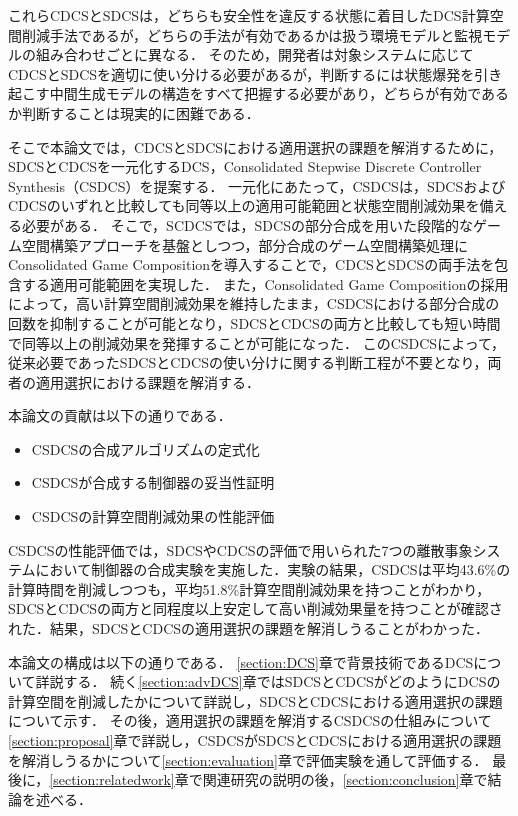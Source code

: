 これらCDCSとSDCSは，どちらも安全性を違反する状態に着目したDCS計算空間削減手法であるが，どちらの手法が有効であるかは扱う環境モデルと監視モデルの組み合わせごとに異なる．
そのため，開発者は対象システムに応じてCDCSとSDCSを適切に使い分ける必要があるが，判断するには状態爆発を引き起こす中間生成モデルの構造をすべて把握する必要があり，どちらが有効であるか判断することは現実的に困難である．

そこで本論文では，CDCSとSDCSにおける適用選択の課題を解消するために，SDCSとCDCSを一元化するDCS，Consolidated Stepwise Discrete Controller Synthesis（CSDCS）を提案する．
一元化にあたって，CSDCSは，SDCSおよびCDCSのいずれと比較しても同等以上の適用可能範囲と状態空間削減効果を備える必要がある．
そこで，SCDCSでは，SDCSの部分合成を用いた段階的なゲーム空間構築アプローチを基盤としつつ，部分合成のゲーム空間構築処理にConsolidated Game Compositionを導入することで，CDCSとSDCSの両手法を包含する適用可能範囲を実現した．
また，Consolidated Game Compositionの採用によって，高い計算空間削減効果を維持したまま，CSDCSにおける部分合成の回数を抑制することが可能となり，SDCSとCDCSの両方と比較しても短い時間で同等以上の削減効果を発揮することが可能になった．
このCSDCSによって，従来必要であったSDCSとCDCSの使い分けに関する判断工程が不要となり，両者の適用選択における課題を解消する．

本論文の貢献は以下の通りである．
\begin{itemize}
	\item CSDCSの合成アルゴリズムの定式化
	\item CSDCSが合成する制御器の妥当性証明
	\item CSDCSの計算空間削減効果の性能評価
\end{itemize}
CSDCSの性能評価では，SDCSやCDCSの評価で用いられた7つの離散事象システムにおいて制御器の合成実験を実施した．実験の結果，CSDCSは平均43.6\%の計算時間を削減しつつも，平均51.8\%計算空間削減効果を持つことがわかり，SDCSとCDCSの両方と同程度以上安定して高い削減効果量を持つことが確認された．結果，SDCSとCDCSの適用選択の課題を解消しうることがわかった．

本論文の構成は以下の通りである．
\ref{section:DCS}章で背景技術であるDCSについて詳説する．
続く\ref{section:advDCS}章ではSDCSとCDCSがどのようにDCSの計算空間を削減したかについて詳説し，SDCSとCDCSにおける適用選択の課題について示す．
その後，適用選択の課題を解消するCSDCSの仕組みについて\ref{section:proposal}章で詳説し，CSDCSがSDCSとCDCSにおける適用選択の課題を解消しうるかについて\ref{section:evaluation}章で評価実験を通して評価する．
最後に，\ref{section:relatedwork}章で関連研究の説明の後，\ref{section:conclusion}章で結論を述べる．